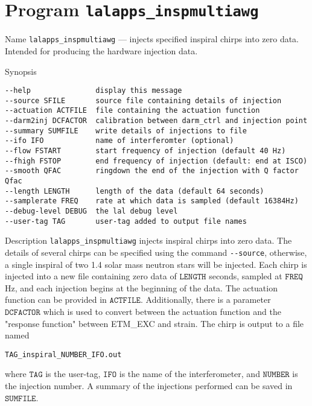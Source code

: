 \section{Program \texttt{lalapps\_inspmultiawg}}
\label{program:lalapps-inspmultiawg}

\begin{entry}
\item[Name]
\verb$lalapps_inspmultiawg$ --- injects specified inspiral chirps into zero
data.  Intended for producing the hardware injection data.

\item[Synopsis]
\begin{verbatim}
--help               display this message
--source SFILE       source file containing details of injection
--actuation ACTFILE  file containing the actuation function
--darm2inj DCFACTOR  calibration between darm_ctrl and injection point
--summary SUMFILE    write details of injections to file
--ifo IFO            name of interferomter (optional)
--flow FSTART        start frequency of injection (default 40 Hz)
--fhigh FSTOP        end frequency of injection (default: end at ISCO)
--smooth QFAC        ringdown the end of the injection with Q factor Qfac
--length LENGTH      length of the data (default 64 seconds)
--samplerate FREQ    rate at which data is sampled (default 16384Hz)
--debug-level DEBUG  the lal debug level
--user-tag TAG       user-tag added to output file names
\end{verbatim}

\item[Description] 
\verb$lalapps_inspmultiawg$ injects inspiral chirps into zero data.  The 
details of several chirps can be specified using the command \verb$--source$,  
otherwise, a single inspiral of two 1.4 solar mass neutron stars will be 
injected.  Each chirp is injected into a new file containing zero data of
$\texttt{LENGTH}$ seconds, sampled at $\texttt{FREQ}$ Hz, and each injection begins at the beginning of the data.  The actuation function can be provided in
$\texttt{ACTFILE}$.  Additionally, there is a parameter $\texttt{DCFACTOR}$ 
which is used to convert between the actuation function and the "response 
function" between ETM\_EXC and strain.  The chirp is output to a file
named
\begin{verbatim}
TAG_inspiral_NUMBER_IFO.out
\end{verbatim}
where $\texttt{TAG}$ is the user-tag, $\texttt{IFO}$ is the name of the 
interferometer, and $\texttt{NUMBER}$ is the injection number.  A summary of
the injections performed can be saved in $\texttt{SUMFILE}$.


\end{entry}
